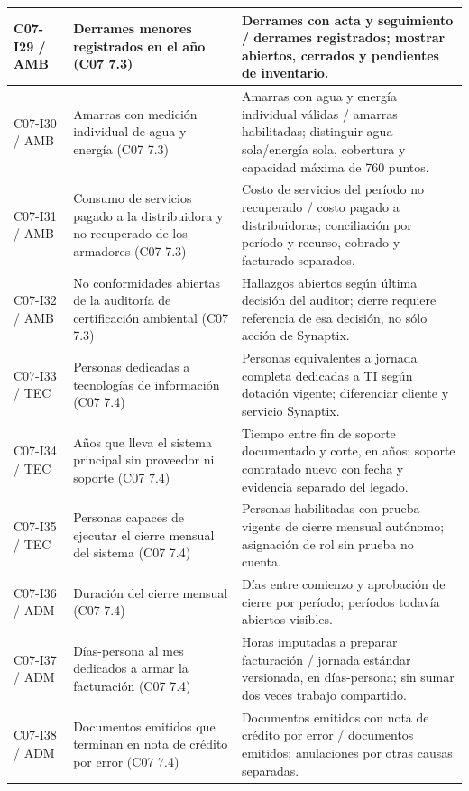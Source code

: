 \begin{longtable}{@{}L{.12\linewidth}L{.32\linewidth}L{\dimexpr.56\tabcolsep\relax}@{}}
C07-I29 / AMB & Derrames menores registrados en el año (C07 7.3) & Derrames con acta y seguimiento /\allowbreak{} derrames registrados; mostrar abiertos, cerrados y pendientes de inventario. \\ \hline
C07-I30 / AMB & Amarras con medición individual de agua y energía (C07 7.3) & Amarras con agua y energía individual válidas /\allowbreak{} amarras habilitadas; distinguir agua sola/\allowbreak{}energía sola, cobertura y capacidad máxima de 760 puntos. \\ \hline
C07-I31 / AMB & Consumo de servicios pagado a la distribuidora y no recuperado de los armadores (C07 7.3) & Costo de servicios del período no recuperado /\allowbreak{} costo pagado a distribuidoras; conciliación por período y recurso, cobrado y facturado separados. \\ \hline
C07-I32 / AMB & No conformidades abiertas de la auditoría de certificación ambiental (C07 7.3) & Hallazgos abiertos según última decisión del auditor; cierre requiere referencia de esa decisión, no sólo acción de Synaptix. \\ \hline
C07-I33 / TEC & Personas dedicadas a tecnologías de información (C07 7.4) & Personas equivalentes a jornada completa dedicadas a TI según dotación vigente; diferenciar cliente y servicio Synaptix. \\ \hline
C07-I34 / TEC & Años que lleva el sistema principal sin proveedor ni soporte (C07 7.4) & Tiempo entre fin de soporte documentado y corte, en años; soporte contratado nuevo con fecha y evidencia separado del legado. \\ \hline
C07-I35 / TEC & Personas capaces de ejecutar el cierre mensual del sistema (C07 7.4) & Personas habilitadas con prueba vigente de cierre mensual autónomo; asignación de rol sin prueba no cuenta. \\ \hline
C07-I36 / ADM & Duración del cierre mensual (C07 7.4) & Días entre comienzo y aprobación de cierre por período; períodos todavía abiertos visibles. \\ \hline
C07-I37 / ADM & Días-persona al mes dedicados a armar la facturación (C07 7.4) & Horas imputadas a preparar facturación /\allowbreak{} jornada estándar versionada, en días-persona; sin sumar dos veces trabajo compartido. \\ \hline
C07-I38 / ADM & Documentos emitidos que terminan en nota de crédito por error (C07 7.4) & Documentos emitidos con nota de crédito por error /\allowbreak{} documentos emitidos; anulaciones por otras causas separadas. \\ \hline

\end{longtable}
